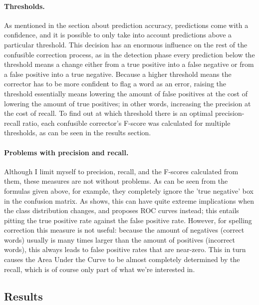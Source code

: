 \documentclass[12pt]{article}
\begin{document}
\paragraph{Thresholds.} As mentioned in the section about prediction accuracy, predictions come with a confidence, and it is possible to only take into account predictions above a particular threshold. This decision has an enormous influence on the rest of the confusible correction process, as in the detection phase every prediction below the threshold means a change either from a true positive into a false negative or from a false positive into a true negative. Because a higher threshold means the corrector has to be more confident to flag a word as an error, raising the threshold essentially means lowering the amount of false positives at the cost of lowering the amount of true positives; in other words, increasing the precision at the cost of recall. To find out at which threshold there is an optimal precision-recall ratio, each confusible corrector's F-score was calculated for multiple thresholds, as can be seen in the results section.

\paragraph{Problems with precision and recall.} Although I limit myself to precision, recall, and the F-scores calculated from them, these measures are not without problems. As can be seen from the formulas given above, for example, they completely ignore the 'true negative' box in the confusion matrix. As \citet{fawcett04} shows, this can have quite extreme implications when the class distribution changes, and proposes ROC curves instead; this entails pitting the true positive rate against the false positive rate. However, for spelling correction this measure is not useful: because the amount of negatives (correct words) usually is many times larger than the amount of positives (incorrect words), this always leads to false positive rates that are near-zero. This in turn causes the Area Under the Curve to be almost completely determined by the recall, which is of course only part of what we're interested in.

\subsection{Results}
\end{document}
